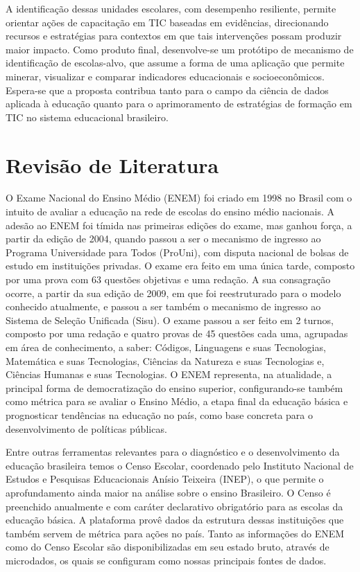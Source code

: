\documentclass[12pt]{article}
\begin{document}
A identificação dessas unidades escolares, com desempenho resiliente, permite orientar ações de capacitação em TIC baseadas em evidências, direcionando recursos e estratégias para contextos em que tais intervenções possam produzir maior impacto. Como produto final, desenvolve-se um protótipo de mecanismo de identificação de escolas-alvo, que assume a forma de uma aplicação que permite minerar, visualizar e comparar indicadores educacionais e socioeconômicos. Espera-se que a proposta contribua tanto para o campo da ciência de dados aplicada à educação quanto para o aprimoramento de estratégias de formação em TIC no sistema educacional brasileiro.

\section{Revisão de Literatura}

O Exame Nacional do Ensino Médio (ENEM) foi criado em 1998 no Brasil com o intuito de avaliar a educação na rede de escolas do ensino médio nacionais. A adesão ao ENEM foi tímida nas primeiras edições do exame, mas ganhou força, a partir da edição de 2004, quando passou a ser o mecanismo de ingresso ao Programa Universidade para Todos (ProUni), com disputa nacional de bolsas de estudo em instituições privadas. O exame era feito em uma única tarde, composto por uma prova com 63 questões objetivas e uma redação. A sua consagração ocorre, a partir da sua edição de 2009, em que foi reestruturado para o modelo conhecido atualmente, e passou a ser também o mecanismo de ingresso ao Sistema de Seleção Unificada (Sisu). O exame passou a ser feito em 2 turnos, composto por uma redação e quatro provas de 45 questões cada uma, agrupadas em área de conhecimento, a saber: Códigos, Linguagens e suas Tecnologias, Matemática e suas Tecnologias, Ciências da Natureza e suas Tecnologias e, Ciências Humanas e suas Tecnologias. O ENEM representa, na atualidade, a principal forma de democratização do ensino superior, configurando-se também como métrica para se avaliar o Ensino Médio, a etapa final da educação básica \cite{misc:decreto_enem} e prognosticar tendências na educação no país, como base concreta para o desenvolvimento de políticas públicas.

Entre outras ferramentas relevantes para o diagnóstico e o desenvolvimento da educação brasileira temos o Censo Escolar, coordenado pelo Instituto Nacional de Estudos e Pesquisas Educacionais Anísio Teixeira (INEP), o que permite o aprofundamento ainda maior na análise sobre o ensino Brasileiro. O Censo é preenchido anualmente e com caráter declarativo obrigatório para as escolas da educação básica. A plataforma provê dados da estrutura dessas instituições que também servem de métrica para ações no país. Tanto as informações do ENEM como do Censo Escolar são disponibilizadas em seu estado bruto, através de microdados, os quais se configuram como nossas principais fontes de dados.
\end{document}
